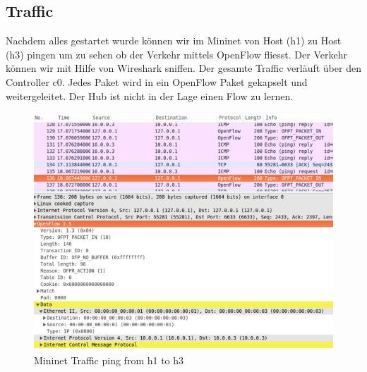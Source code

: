 \documentclass[a4,12pt]{scrartcl}
\begin{document}
\subsection{Traffic}
Nachdem alles gestartet wurde können wir im Mininet von Host (h1) zu Host (h3) pingen um zu sehen ob der Verkehr mittels OpenFlow fliesst. Der Verkehr können wir mit Hilfe von Wireshark sniffen. Der gesamte Traffic verläuft über den Controller c0. Jedes Paket wird in ein OpenFlow Paket gekapselt und weitergeleitet. Der Hub ist nicht in der Lage einen Flow zu lernen. 
\begin{figure} [H]
	\begin{center}
	\includegraphics[width=1.00\textwidth]{./pictures/simple_hub_traffic.png}
	\caption{Mininet Traffic ping from h1 to h3}
	\label{x}
	\end{center}
\end{figure} 
\end{document}
